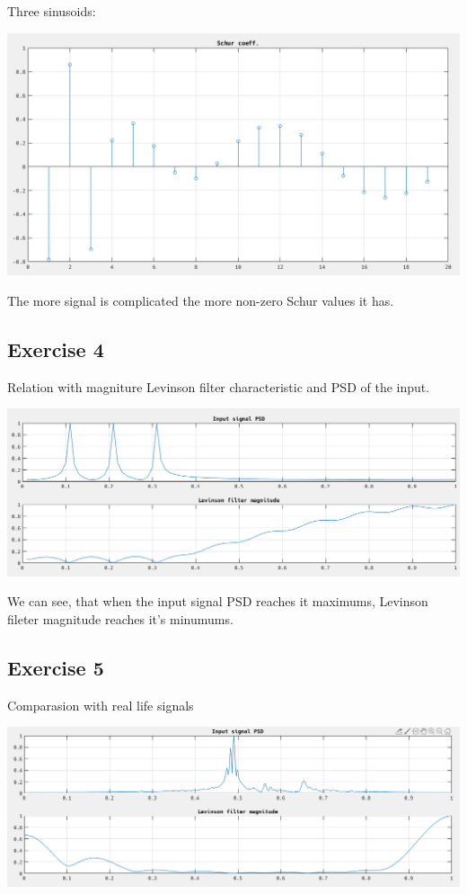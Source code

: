 \documentclass[12pt]{article}
\begin{document}
Three sinusoids:

\includegraphics[width=\textwidth]{13.png}

The more signal is complicated the more non-zero Schur values it has.

\subsection{Exercise 4}

Relation with magniture Levinson filter characteristic and PSD of the input.

\includegraphics[width=\textwidth]{14.png}

We can see, that when the input signal PSD reaches it maximums, Levinson fileter magnitude reaches it's minumums.

\subsection{Exercise 5}

Comparasion with real life signals

\includegraphics[width=\textwidth]{15.png}
\end{document}
